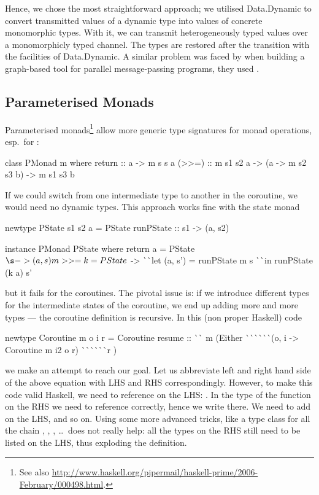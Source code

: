 %


Hence, we chose the most straightforward approach; we utilised \textsf{Data.Dynamic} to convert transmitted values of a dynamic type into values of concrete monomorphic types.
With it, we can transmit heterogeneously typed values over a monomorphicly typed channel.
The types are restored after the transition with the facilities of \textsf{Data.Dynamic}.
A similar problem was faced by \citeauthor{grace-tfp} when building a graph-based tool for parallel message-passing programs, they used  \cite{grace-tfp}.

\subsection{Parameterised Monads}
Parameterised monads\footnote{See also \url{http://www.haskell.org/pipermail/haskell-prime/2006-February/000498.html}.}  allow more generic type signatures for monad operations, esp.\ for \hs{>>=}\xspace\nolinebreak[4] \cite{CambridgeJournals:8240527,Ghani:2005:MAG:1090189.1086403,monad-parametrisable}:
\begin{code}
class PMonad m where
  return :: a -> m s s a
  (>>=)  :: m s1 s2 a -> (a -> m s2 s3 b) -> m s1 s3 b
\end{code}
If we could switch from one  intermediate type to another in the coroutine, we would need no dynamic types.
This approach works fine with the state monad
\begin{code}
newtype PState s1 s2 a
  = PState { runPState :: s1 -> (a, s2) }

instance PMonad PState where
  return a  = PState $ \s -> (a, s)
  m >>= k   = PState $ \s ->
                ^^ ^^ let (a, s') = runPState m s
                ^^ ^^ in  runPState (k a) s'
\end{code}
but it fails for the coroutines.
The pivotal issue is: if we introduce different types for the intermediate states of the coroutine, we end up adding more and more types --- the coroutine definition is recursive.
In this (non proper Haskell) code
\begin{code}
newtype Coroutine m o i r
  =  Coroutine { resume ::
       ^^ ^^  m (Either
       ^^ ^^ ^^ ^^ ^^ ^^ (o, i -> Coroutine m i2 o r)
       ^^ ^^ ^^ ^^ ^^ ^^ r 
       )}
\end{code}
we make an attempt to reach our goal.
Let us abbreviate left and right hand side of the above equation with LHS and RHS correspondingly.
However, to make this code valid Haskell, we need to reference  on the LHS: .
In the type of the  function on the RHS we need to reference  correctly, hence we write  there.
We need to add  on the LHS, and so on.
Using some more advanced tricks, like a type class for all the chain , , , \dots\ does not really help: all the types on the RHS still need to be listed on the LHS, thus exploding the definition.

